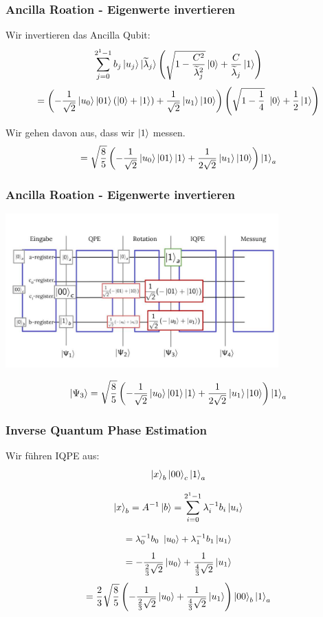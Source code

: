 \begin{frame}
    \frametitle{Ancilla Roation - Eigenwerte invertieren}
    Wir invertieren das Ancilla Qubit:
    $$\sum_{j=0}^{2^{1}-1} b_j \ket{u_j} \ket{\widetilde{\lambda}_j} \left(\sqrt{1-\frac{C^2}{\widetilde{\lambda}_j^2}}\ket{0} + \frac{C}{\widetilde{\lambda}_j} \ket{1}\right)$$
    $$=\left(-\frac{1}{\sqrt{2}} \ket{u_0} \ket{01}\left(\ket{0} +\ket{1}\right)+\frac{1}{\sqrt{2}} \ket{u_1} \ket{10}\right)\left(\sqrt{1-\frac{1}{4}}\ \ket{0} + \frac{1}{2} \ket{1}\right)$$

    \hfil

    \hfil

    Wir gehen davon aus, dass wir $\ket{1}$ messen.
    $$  =\sqrt{\frac{8}{5}}\left(-\frac{1}{\sqrt{2}} \ket{u_0}\ket{01}\ket{1} +\frac{1}{2\sqrt{2}} \ket{u_1} \ket{10}\right)\ket{1}_a$$
\end{frame}

\begin{frame}
    \frametitle{Ancilla Roation - Eigenwerte invertieren}
    \begin{center}

    \includegraphics[width=10.5cm]{img/example_circuit/example_circuit_3.jpg}
    \end{center}

    $$ \ket{\Psi_3} =\sqrt{\frac{8}{5}}\left(-\frac{1}{\sqrt{2}} \ket{u_0}\ket{01}\ket{1} +\frac{1}{2\sqrt{2}} \ket{u_1} \ket{10}\right)\ket{1}_a$$
\end{frame}



\begin{frame}
    \frametitle{Inverse Quantum Phase Estimation}
    Wir führen IQPE aus:
    $$\ket{x}_b \ket{00}_c \ket{1}_a $$
    
    $$ \ket{x}_b =  A^{-1} \ket{b} = 
    \sum_{i=0}^{2^{1}-1} 
    \lambda_i^{-1} b_i\ket{u_i} $$

    $$=\lambda_0^{-1} b_0\  \ket{u_0} +  \lambda_1^{-1} b_1\ket{u_1}$$
    $$=-\frac{1}{\frac{2}{3}\sqrt{2}} \ket{u_0} +\frac{1}   {\frac{4}{3}\sqrt{2}}  \ket{u_1}$$
    $$=\frac{2}{3}\sqrt{\frac{8}{5}} \left( -\frac{1}{\frac{2}{3}\sqrt{2}} \ket{u_0} +\frac{1}   {\frac{4}{3}\sqrt{2}}  \ket{u_1}\right)  \ket{00}_b \ket{1}_a $$

\end{frame}

